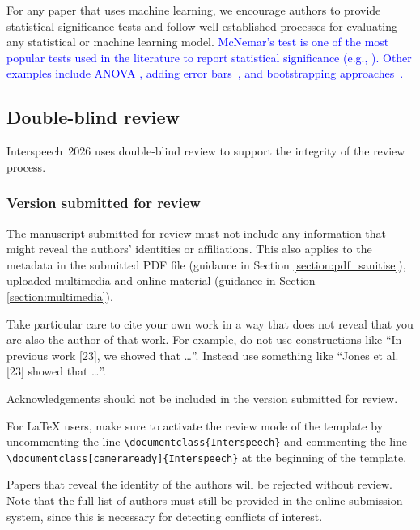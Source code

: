 \documentclass[cameraready]{Interspeech}
\newcommand{\blue}[1]{\textcolor{blue}{#1}}
\begin{document}
For any paper that uses machine learning, we encourage authors to provide statistical significance tests and follow well-established processes for evaluating any statistical or machine learning model. \blue{McNemar’s test \cite{mcnemar1947} is one of the most popular tests used in the literature to report statistical significance (e.g., \cite{fiscus1997post, chollet1995evaluation, williams2008exploiting, busch2025multilingual, lin2025voice, lee2025performance}). Other examples include ANOVA \cite{allbert2025evaluating}, adding error bars~\cite{miller2024addingerrorbarsevals}, and bootstrapping approaches~\cite{ferrer2024goodpracticesevaluationmachine, url2025}.}

\subsection{Double-blind review}
\label{section:doubleblind}

Interspeech~2026 uses double-blind review to support the integrity of the review process.

\subsubsection{Version submitted for review}

The manuscript submitted for review must not include any information that might reveal the authors' identities or affiliations. This also applies to the metadata in the submitted PDF file (guidance in Section \ref{section:pdf_sanitise}), uploaded multimedia and online material (guidance in Section \ref{section:multimedia}).

Take particular care to cite your own work in a way that does not reveal that you are also the author of that work. For example, do not use constructions like ``In previous work [23], we showed that \ldots''. Instead use something like ``Jones et al. [23] showed that \ldots''.

Acknowledgements should not be included in the version submitted for review.

{\color{blue}
For \LaTeX{} users, make sure to activate the review mode of the template by uncommenting the line \verb|\documentclass{Interspeech}| and commenting the line \verb|\documentclass[cameraready]{Interspeech}| at the beginning of the template.}

Papers that reveal the identity of the authors will be rejected without review.
Note that the full list of authors must still be provided in the online submission system, since this is necessary for detecting conflicts of interest.
\end{document}
